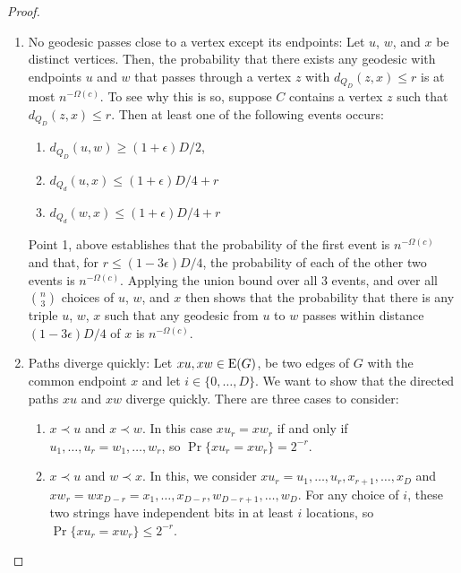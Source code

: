 \documentclass{patmorin}
\newcommand{\eps}{\epsilon}
\begin{document}
\begin{proof}
\begin{enumerate}
     \item No geodesic passes close to a vertex except its endpoints:
      Let $u$, $w$, and $x$ be distinct vertices.  Then, the probability
      that there exists any geodesic with endpoints $u$ and $w$
      that passes through a vertex $z$ with $d_{Q_D}(z,x)\le r$ is at most
      $n^{-\Omega(c)}$.  To see why this is so, suppose $C$ contains a
      vertex $z$ such that $d_{Q_D}(z,x) \le r$.  Then at least one of
      the following events occurs:
     \begin{enumerate}
       \item $d_{Q_D}(u,w) \ge (1+\eps)D/2$, 
       \item $d_{Q_d}(u,x) \le (1+\eps)D/4+r$
       \item $d_{Q_d}(w,x) \le (1+\eps)D/4+r$
     \end{enumerate}
     Point 1, above establishes that the probability of the first event is
     $n^{-\Omega(c)}$ and that, for $r\le (1-3\eps)D/4$, the probability
     of each of the other two events is $n^{-\Omega(c)}$.  Applying the
     union bound over all 3 events, and over all $\binom{n}{3}$ choices
     of $u$, $w$, and $x$ then shows that the probability that there
     is any triple $u$, $w$, $x$ such that any geodesic from $u$ to $w$
     passes within distance $(1-3\eps)D/4$ of $x$ is $n^{-\Omega(c)}$.


     \item Paths diverge quickly:
      Let $xu,xw\in \mathrm{E}(G)$, be two edges of $G$ with the common endpoint
      $x$ and let $i\in\{0,\ldots,D\}$.  We want to show that the
      directed paths $xu$ and $xw$ diverge quickly.  There are three
      cases to consider:
     \begin{enumerate}
        \item $x\prec u$ and $x\prec w$.  In this case $xu_r=xw_r$ if and
        only if $u_1,\ldots,u_r=w_1,\ldots,w_r$, so $\Pr\{xu_r=xw_r\}=
        2^{-r}$.

        \item $x\prec u$ and $w\prec x$.  In this, we
        consider $xu_r=u_1,\ldots,u_r,x_{r+1},\ldots,x_D$ and
        $xw_r=wx_{D-r}=x_1,\ldots,x_{D-r},w_{D-r+1},\ldots,w_D$. For
        any choice of $i$, these two strings have independent bits in
        at least $i$ locations, so $\Pr\{xu_r=xw_r\}\le 2^{-r}$.


\end{enumerate}
\end{enumerate}
\end{proof}
\end{document}
